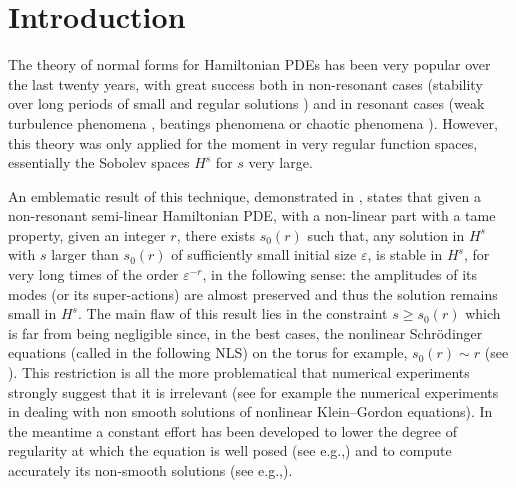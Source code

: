 \documentclass[11pt]{article}
\newcommand{\eg}{e.g.,\xspace}
\theoremstyle{definition}
\begin{document}
\section{Introduction}

The theory of normal forms for Hamiltonian PDEs has been very popular over the last twenty years, with great success both in non-resonant cases (stability over long periods of small and regular solutions \cite{Bou96,Bam99,Bou00,Bam03,BG06,BDGS07,GIP,Del12,FGL13,YZ14,BD17,FI19,KillBill,BMP20,FI20,KtA}) and in resonant cases (weak turbulence phenomena \cite{CKSTT10,CF12,GG12,GK15}, beatings phenomena \cite{GV,GT12,HP17} or chaotic phenomena \cite{GGMP21}). However, this theory was only applied for the moment in very regular function spaces, essentially the Sobolev spaces $H^s$ for $s$ very large.\enlargethispage{\baselineskip}%

An emblematic result of this technique, demonstrated in \cite{BG06}, states that given a non-resonant semi-linear Hamiltonian PDE, with a non-linear part with a tame property, given an integer $r$, there exists $s_0(r)$ such that, any solution in $H^s$ with $s$ larger than $s_0(r)$ of sufficiently small initial size $\varepsilon$, is stable in $H^s$, for very long times of the order $\varepsilon^{-r}$, in the following sense: the amplitudes of its modes (or its super-actions) are almost preserved and thus the solution remains small in $H^s$. The main flaw of this result lies in the constraint $s\geq s_0(r)$ which is far from being negligible since, in the best cases, the nonlinear Schrödinger equations (called in the following NLS) on the torus for example, $s_0(r)\sim r$ (see \cite{BMP20}). This restriction is all the more problematical that numerical experiments strongly suggest that it is irrelevant (see for example the numerical experiments in \cite{CHL08a,CHL08b} dealing with non smooth solutions of nonlinear Klein--Gordon equations). In the meantime a constant effort has been developed to lower the degree of regularity at which the equation is well posed (see \eg \cite{Vla84,Bou93,Bou99,Caz03,BGT05}) and to compute accurately its non-smooth solutions (see \eg \cite{HS17,ORS20}).
\end{document}
